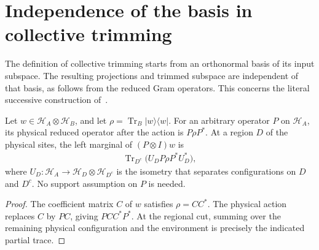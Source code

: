 \section{Independence of the basis in collective trimming}

The definition of collective trimming starts from an orthonormal basis of
its input subspace. The resulting projections and trimmed subspace are
independent of that basis, as follows from the reduced Gram operators.
This concerns the literal successive construction
of~\cite[lines 648--655]{Arad2016RigorousRG}.

\begin{theorem}
    \label{thm:trimming_reduced_gram}
    \leanok
    Let $w\in\mathcal H_A\otimes\mathcal H_B$, and let
    $\rho=\operatorname{Tr}_B|w\rangle\langle w|$.
    For an arbitrary operator $P$ on $\mathcal H_A$, its physical reduced
    operator after the action is $P\rho P^*$. At a region $D$ of the physical
    sites, the left marginal of $(P\otimes I)w$ is
    \begin{align}
        \operatorname{Tr}_{D^c}
        \bigl(U_D P\rho P^*U_D^*\bigr),
    \end{align}
    where $U_D:\mathcal H_A\to\mathcal H_D\otimes\mathcal H_{D^c}$ is the
    isometry that separates configurations on $D$ and $D^c$. No support assumption on $P$ is needed.
\end{theorem}
\begin{proof}\leanok
    The coefficient matrix $C$ of $w$ satisfies $\rho=CC^*$.
    The physical action replaces $C$ by $PC$, giving $PCC^*P^*$.
    At the regional cut, summing over the remaining physical configuration
    and the environment is precisely the indicated partial trace.
\end{proof}

